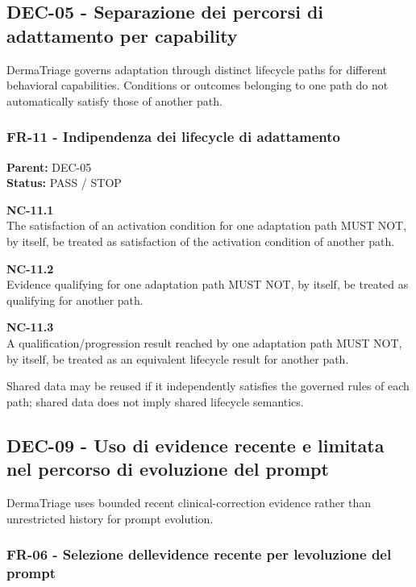 \documentclass[11pt,a4paper]{article}
\begin{document}
\subsection{DEC-05 - Separazione dei percorsi di adattamento per
capability}\label{dec-05---separazione-dei-percorsi-di-adattamento-per-capability}

DermaTriage governs adaptation through distinct lifecycle paths for
different behavioral capabilities. Conditions or outcomes belonging to
one path do not automatically satisfy those of another path.

\subsubsection{FR-11 - Indipendenza dei lifecycle di
adattamento}\label{fr-11---indipendenza-dei-lifecycle-di-adattamento}

\textbf{Parent:} DEC-05\\
\textbf{Status:} PASS / STOP

\textbf{NC-11.1}\\
The satisfaction of an activation condition for one adaptation path MUST
NOT, by itself, be treated as satisfaction of the activation condition
of another path.

\textbf{NC-11.2}\\
Evidence qualifying for one adaptation path MUST NOT, by itself, be
treated as qualifying for another path.

\textbf{NC-11.3}\\
A qualification/progression result reached by one adaptation path MUST
NOT, by itself, be treated as an equivalent lifecycle result for another
path.

Shared data may be reused if it independently satisfies the governed
rules of each path; shared data does not imply shared lifecycle
semantics.

\subsection{DEC-09 - Uso di evidence recente e limitata nel percorso di
evoluzione del
prompt}\label{dec-09---uso-di-evidence-recente-e-limitata-nel-percorso-di-evoluzione-del-prompt}

DermaTriage uses bounded recent clinical-correction evidence rather than
unrestricted history for prompt evolution.

\subsubsection{FR-06 - Selezione dell\textquotesingle evidence recente
per l\textquotesingle evoluzione del
prompt}\label{fr-06---selezione-dellevidence-recente-per-levoluzione-del-prompt}
\end{document}
